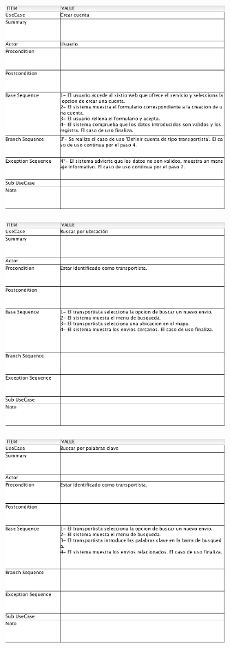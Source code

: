 \documentclass[10pt, a4paper,spanish]{article}
\begin{document}
		\begin{figure}[H]
			\centering
				\includegraphics[width=0.75\textwidth]{astah/use_case_crear_cuenta.png}
		\end{figure}

		\begin{figure}[H]
			\centering
				\includegraphics[width=0.75\textwidth]{astah/use_case_buscar_ubicacion.png}
		\end{figure}

		\begin{figure}[H]
			\centering
				\includegraphics[width=0.75\textwidth]{astah/use_case_buscar_palabras_clave.png}
		\end{figure}
\end{document}
